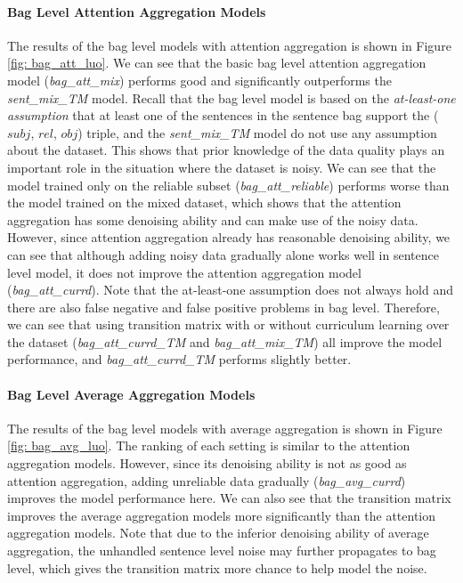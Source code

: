 \paragraph{Bag Level Attention Aggregation Models}
The results of the bag level models with attention aggregation is shown in Figure \ref{fig: bag_att_luo}. We can see that the basic bag level attention aggregation model (\emph{bag\_att\_mix}) performs good and significantly outperforms the \emph{sent\_mix\_TM} model. Recall that the bag level model is based on the \emph{at-least-one assumption} that at least one of the sentences in the sentence bag support the ($subj$, $rel$, $obj$) triple, and the \emph{sent\_mix\_TM} model do not use any assumption about the dataset. This shows that prior knowledge of the data quality plays an important role in the situation where the dataset is noisy. We can see that the model trained only on the reliable subset (\emph{bag\_att\_reliable}) performs worse than the model trained on the mixed dataset, which shows that the attention aggregation has some denoising ability and can make use of the noisy data. However, since attention aggregation already has reasonable denoising ability, we can see that although adding noisy data gradually alone works well in sentence level model, it does not improve the attention aggregation model (\emph{bag\_att\_currd}). Note that the at-least-one assumption does not always hold and there are also false negative and false positive problems in bag level. Therefore, we can see that using transition matrix with or without curriculum learning over the dataset (\emph{bag\_att\_currd\_TM} and \emph{bag\_att\_mix\_TM}) all improve the model performance, and \emph{bag\_att\_currd\_TM} performs slightly better.

\paragraph{Bag Level Average Aggregation Models}
The results of the bag level models with average aggregation is shown in Figure \ref{fig: bag_avg_luo}. The ranking of each setting is similar to the attention aggregation models. However, since its denoising ability is not as good as attention aggregation, adding unreliable data gradually (\emph{bag\_avg\_currd}) improves the model performance here. We can also see that the transition matrix improves the average aggregation models more significantly than the attention aggregation models. Note that due to the inferior denoising ability of average aggregation, the unhandled sentence level noise may further propagates to bag level, which gives the transition matrix more chance to help model the noise.

